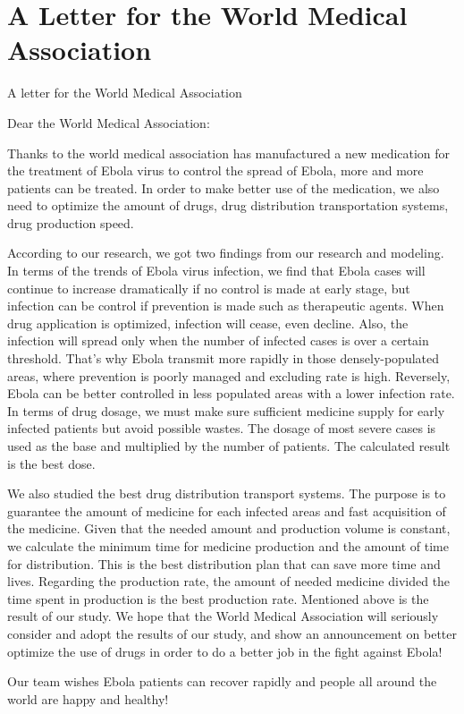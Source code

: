 \documentclass{icmmcm}
\begin{document}
\section{A Letter for the World Medical Association}
\centerline{A letter for the World Medical Association}
Dear the World Medical Association:
\par Thanks to the world medical association has manufactured a
new medication for the treatment of Ebola virus to control the
spread of Ebola, more and more patients can be treated. In
order to make better use of the medication, we also need to
optimize the amount of drugs, drug distribution transportation
systems, drug production speed.
\par According to our research, we got two findings from our
research and modeling. In terms of the trends of Ebola virus
infection, we find that Ebola cases will continue to increase
dramatically if no control is made at early stage, but
infection can be control if prevention is made such as
therapeutic agents. When drug application is optimized,
infection will cease, even decline. Also, the infection will
spread only when the number of infected cases is over a certain
threshold. That's why Ebola transmit more rapidly in those
densely-populated areas, where prevention is poorly managed and
excluding rate is high. Reversely, Ebola can be better
controlled in less populated areas with a lower infection rate.
In terms of drug dosage, we must make sure sufficient medicine
supply for early infected patients but avoid possible wastes.
The dosage of most severe cases is used as the base and
multiplied by the number of patients. The calculated result is
the best dose.
\par We also studied the best drug distribution transport
systems. The purpose is to guarantee the amount of medicine for
each infected areas and fast acquisition of the medicine. Given
that the needed amount and production volume is constant, we
calculate the minimum time for medicine production and the
amount of time for distribution. This is the best distribution
plan that can save more time and lives. Regarding the
production rate, the amount of needed medicine divided the time
spent in production is the best production rate.
Mentioned above is the result of our study. We hope that the
World Medical Association will seriously consider and adopt the results of our study, and
show an announcement on better optimize the use of drugs in
order to do a better job in the fight against Ebola!
\par Our team wishes Ebola patients can recover rapidly and
people all around the world are happy and healthy!\\\nline%
\end{document}
